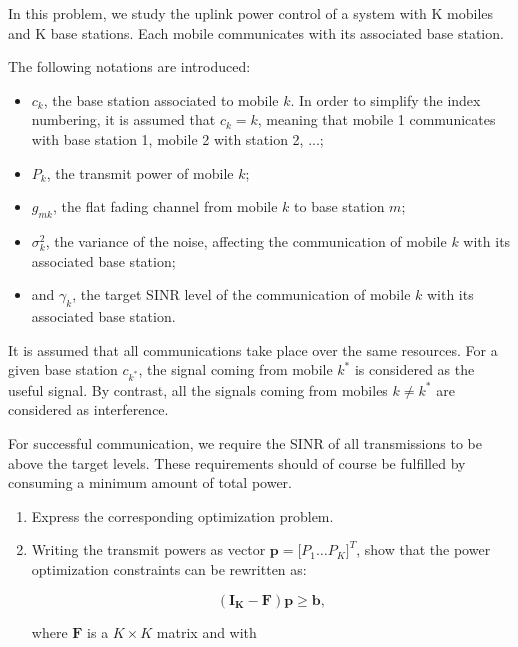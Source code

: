 \documentclass [a4paper, 11pt] {article}
\begin{document}
    \begin{exercise}{2}

         In this problem, we study the uplink power control of a system with K mobiles and K base stations. Each mobile communicates with its associated base station.

The following notations are introduced:
\begin{itemize}
    \item $c_k$, the base station associated to mobile $k$. In order to simplify the index numbering, it is assumed that $c_k = k$, meaning that mobile 1 communicates with base station 1, mobile 2 with station 2, ...;
    \item $P_k$, the transmit power of mobile $k$;
    \item $g_{mk}$, the flat fading channel from mobile $k$ to base station $m$;
    \item $\sigma_k^2$, the variance of the noise, affecting the communication of mobile $k$ with its associated base station;
    \item and $\gamma_k$, the target SINR level of the communication of mobile $k$ with its associated base station.
\end{itemize}

It is assumed that all communications take place over the same resources. For a given base station $c_{k^*}$, the signal coming from mobile $k^*$ is considered as the useful signal. By contrast, all the signals coming from mobiles $k\neq k^*$ are considered as interference.


For successful communication, we require the SINR of all transmissions to be above the target levels. These requirements should of course be fulfilled by consuming a minimum amount of total power.



\begin{enumerate}

\item Express the corresponding optimization problem.

\item Writing the transmit powers as vector $\mathbf{p} = \big[P_1 \hdots P_K\big]^T$, show that the power optimization constraints can be rewritten as:

\begin{equation}
(\mathbf{I_K} - \mathbf{F})\mathbf{p} \geq \mathbf{b},
\end{equation}


where $\mathbf{F}$ is a $K \times K$ matrix and with


\end{enumerate}
\end{exercise}
\end{document}
